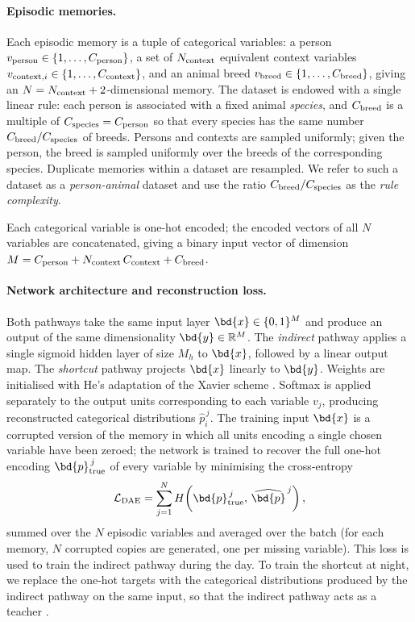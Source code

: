 \paragraph{Episodic memories.}
Each episodic memory is a tuple of categorical variables: a person
$v_{\rm person} \in \{1,\dots,C_{\rm person}\}$, a set of $N_{\rm context}$
equivalent context variables $v_{{\rm context},i} \in
\{1,\dots,C_{\rm context}\}$, and an animal breed
$v_{\rm breed} \in \{1,\dots,C_{\rm breed}\}$, giving an
$N = N_{\rm context}+2$-dimensional memory. The dataset is endowed with a
single linear rule: each person is associated with a fixed animal
\emph{species}, and $C_{\rm breed}$ is a multiple of
$C_{\rm species}=C_{\rm person}$ so that every species has the same number
$C_{\rm breed}/C_{\rm species}$ of breeds. Persons and contexts are sampled
uniformly; given the person, the breed is sampled uniformly over the breeds
of the corresponding species. Duplicate memories within a dataset are
resampled. We refer to such a dataset as a \emph{person-animal} dataset and
use the ratio $C_{\rm breed}/C_{\rm species}$ as the \emph{rule complexity}.

Each categorical variable is one-hot encoded; the encoded vectors of all
$N$ variables are concatenated, giving a binary input vector of dimension
$M = C_{\rm person} + N_{\rm context}\,C_{\rm context} + C_{\rm breed}$.

\paragraph{Network architecture and reconstruction loss.}
Both pathways take the same input layer $\bd{x}\in\{0,1\}^M$ and produce an
output of the same dimensionality $\bd{y}\in\mathbb{R}^M$. The
\emph{indirect} pathway applies a single sigmoid hidden layer of size $M_h$
to $\bd{x}$, followed by a linear output map. The \emph{shortcut} pathway
projects $\bd{x}$ linearly to $\bd{y}$. Weights are initialised with He's
adaptation of the Xavier scheme \cite{He2015}. Softmax is applied
separately to the output units corresponding to each variable $v_j$,
producing reconstructed categorical distributions
$\widehat{p}_i^{\,j}$. The training input $\bd{x}$ is a corrupted version
of the memory in which all units encoding a single chosen variable have
been zeroed; the network is trained to recover the full one-hot encoding
$\bd{p}_{\rm true}^{\,j}$ of every variable by minimising the
cross-entropy
\begin{align}
  \mathcal{L}_{\rm DAE} = \sum_{j=1}^{N}
  H\!\left(\bd{p}_{\rm true}^{\,j},\,\widehat{\bd{p}}^{\,j}\right),
  \label{eq:dae_loss}
\end{align}
summed over the $N$ episodic variables and averaged over the batch (for
each memory, $N$ corrupted copies are generated, one per missing variable).
This loss is used to train the indirect pathway during the day. To train
the shortcut at night, we replace the one-hot targets with the categorical
distributions produced by the indirect pathway on the same input, so that
the indirect pathway acts as a teacher \cite{Remme2021}.


